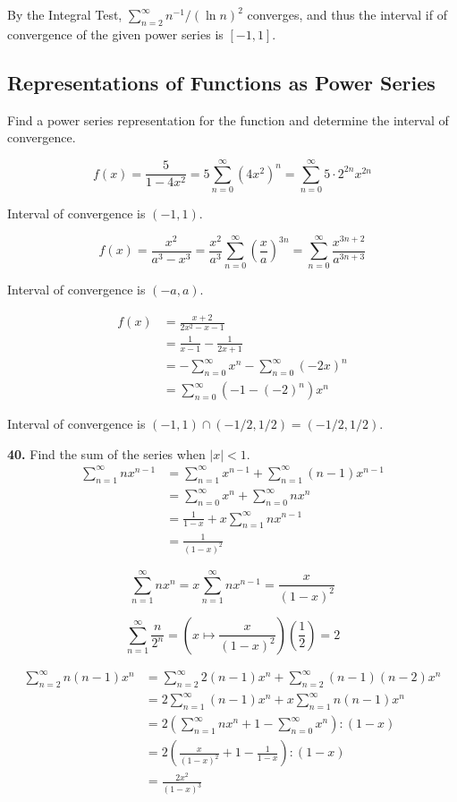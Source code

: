 \documentclass[a4paper,12pt]{article}
\begin{document}
By the Integral Test, $\sum_{n=2}^\infty n^{-1}/(\ln n)^2$ converges, and thus
the interval if of convergence of the given power series is $[-1, 1]$.

\subsection{Representations of Functions as Power Series}
Find a power series representation for the function and determine the interval
of convergence.

\[f(x) = \frac{5}{1 - 4x^2}
       = 5\sum_{n=0}^\infty\left(4x^2\right)^n
       = \sum_{n=0}^\infty 5 \cdot 2^{2n} x^{2n}\tag{4}\]

Interval of convergence is $(-1, 1)$.

\[f(x) = \frac{x^2}{a^3 - x^3}
       = \frac{x^2}{a^3}\sum_{n=0}^\infty\left(\frac{x}{a}\right)^{3n}
       = \sum_{n=0}^\infty\frac{x^{3n + 2}}{a^{3n + 3}}\tag{10}\]

Interval of convergence is $(-a, a)$.

\begin{align*}
f(x) &= \frac{x + 2}{2x^2 - x - 1}\\
     &= \frac{1}{x - 1} - \frac{1}{2x + 1}\\
     &= -\sum_{n=0}^\infty x^n - \sum_{n=0}^\infty (-2x)^n\\
     &= \sum_{n=0}^\infty (-1 - (-2)^n)x^n\tag{12}
\end{align*}

Interval of convergence is $(-1, 1) \cap (-1/2, 1/2) = (-1/2, 1/2)$.

\noindent\textbf{40. }Find the sum of the series when $|x| < 1$.
\begin{align*}
   \sum_{n=1}^\infty nx^{n - 1}
&= \sum_{n=1}^\infty x^{n - 1} + \sum_{n=1}^\infty (n - 1)x^{n - 1}\\
&= \sum_{n=0}^\infty x^n + \sum_{n=0}^\infty nx^n\\
&= \frac{1}{1 - x} + x\sum_{n=1}^\infty nx^{n - 1}\\
&= \frac{1}{(1 - x)^2}\tag{a}
\end{align*}

\[\sum_{n=1}^\infty nx^n
= x\sum_{n=1}^\infty nx^{n - 1}
= \frac{x}{(1 - x)^2}\tag{b.i}\]

\[\sum_{n=1}^\infty \frac{n}{2^n}
= \left(x \mapsto \frac{x}{(1 - x)^2}\right)\left(\frac{1}{2}\right)
= 2\tag{b.ii}\]

\begin{align*}
   \sum_{n=2}^\infty n(n - 1)x^n
&= \sum_{n=2}^\infty 2(n - 1)x^n + \sum_{n=2}^\infty (n - 1)(n - 2)x^n\\
&= 2\sum_{n=1}^\infty (n - 1)x^n + x\sum_{n=1}^\infty n(n - 1)x^n\\
&= 2\left(\sum_{n=1}^\infty nx^n + 1 - \sum_{n=0}^\infty x^n\right) : (1 - x)\\
&= 2\left(\frac{x}{(1 - x)^2} + 1 - \frac{1}{1 - x}\right) : (1 - x)\\
&= \frac{2x^2}{(1 - x)^3}\tag{c.i}
\end{align*}
\end{document}
